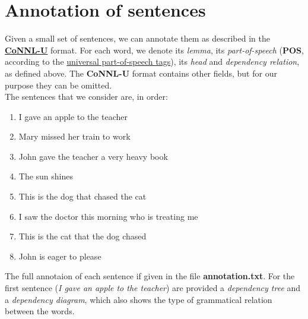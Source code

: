 \documentclass[
12pt,
a4paper,
oneside,
headinclude,
footinclude]{article}
\begin{document}
    
    \section{Annotation of sentences}
    
    Given a small set of sentences, we can annotate them as described in the \textbf{\href{http://universaldependencies.org/format.html}{CoNNL-U}} format.
    For each word, we denote its \textit{lemma}, its \textit{part-of-speech} (\textbf{POS}, according to the \href{http://universaldependencies.org/u/pos/index.html}{universal part-of-speech tags}), its \textit{head} and \textit{dependency relation}, as defined above. The \textbf{CoNNL-U} format contains other fields, but for our purpose they can be omitted.\\
    
    The sentences that we consider are, in order:
    
    \begin{enumerate}
        \item I gave an apple to the teacher
        \item Mary missed her train to work
        \item John gave the teacher a very heavy book 
        \item The sun shines 
        \item This is the dog that chased the cat 
        \item I saw the doctor this morning who is treating me 
        \item This is the cat that the dog chased 
        \item John is eager to please  
    \end{enumerate} 

    The full annotaion of each sentence if given in the file \textbf{annotation.txt}.
    For the first sentence (\textit{I gave an apple to the teacher}) are provided a \textit{dependency tree} and a \textit{dependency diagram}, which also shows the type of grammatical relation between the words.
       
    
    \begin{center}
    \end{center}
   
\end{document}
